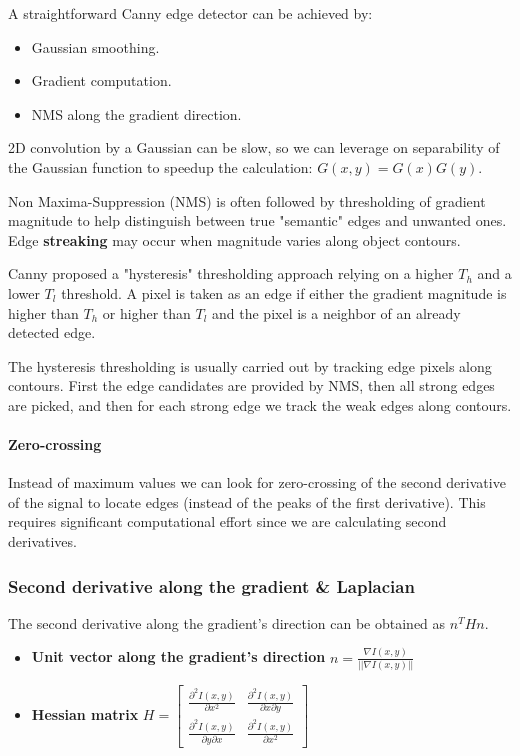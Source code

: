 A straightforward Canny edge detector can be achieved by:
\begin{itemize}
  \item Gaussian smoothing.
  \item Gradient computation.
  \item NMS along the gradient direction.
\end{itemize}

2D convolution by a Gaussian can be slow, so we can leverage on separability of the Gaussian function to speedup the calculation: $G(x,y) = G(x)G(y)$.

Non Maxima-Suppression (NMS) is often followed by thresholding of gradient magnitude to help distinguish between true "semantic" edges and unwanted ones.
Edge \textbf{streaking} may occur when magnitude varies along object contours.

Canny proposed a "hysteresis" thresholding approach relying on a higher $T_h$ and a lower $T_l$ threshold.
A pixel is taken as an edge if either the gradient magnitude is higher than $T_h$ or higher than $T_l$ and the pixel is a neighbor of an already detected edge.

The hysteresis thresholding is usually carried out by tracking edge pixels along contours.
First the edge candidates are provided by NMS, then all strong edges are picked, and then for each strong edge we track the weak edges along contours.

\paragraph{Zero-crossing}
Instead of maximum values we can look for zero-crossing of the second derivative of the signal to locate edges (instead of the peaks of the first derivative).
This requires significant computational effort since we are calculating second derivatives.

\subsubsection{Second derivative along the gradient \& Laplacian}
The second derivative along the gradient's direction can be obtained as $n^THn$.

\begin{itemize}
  \item \textbf{Unit vector along the gradient's direction} $n = \frac{\nabla I(x,y)}{||\nabla I(x,y)||}$
  \item \textbf{Hessian matrix} $H =  \begin{bmatrix} \frac{\partial^2 I(x,y)}{\partial x^2} & \frac{\partial^2 I(x,y)}{\partial x \partial y} \\ \frac{\partial^2 I(x,y)}{\partial y \partial x} & \frac{\partial^2 I(x,y)}{\partial x^2} \end{bmatrix} $
\end{itemize}


